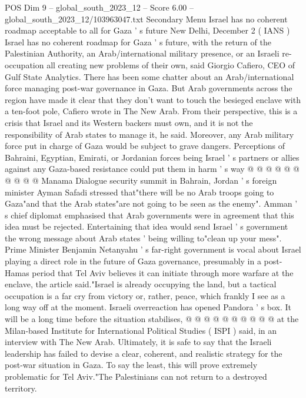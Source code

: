 \begin{textsample}{POS Dim 9 – global\_south\_2023\_12 – Score 6.00 – global\_south\_2023\_12/103963047.txt}  \label{ex:f9_pos_010}
Secondary Menu Israel has no coherent roadmap acceptable to all for Gaza ' s future New Delhi, December 2 ( IANS ) Israel has no coherent roadmap for Gaza ' s future, with the return of the Palestinian Authority, an Arab/international military presence, or an Israeli re-occupation all creating new problems of their own, said Giorgio Cafiero, CEO of Gulf State Analytics.
There has been some chatter about an Arab/international force managing post-war governance in Gaza.
But Arab governments across the region have made it clear that they don't want to touch the besieged enclave with a ten-foot pole, Cafiero wrote in The New Arab.
From their perspective, this is a crisis that Israel and its Western backers must own, and it is not the responsibility of Arab states to manage it, he said.
Moreover, any Arab military force put in charge of Gaza would be subject to grave dangers.
Perceptions of Bahraini, Egyptian, Emirati, or Jordanian forces being Israel ' s partners or allies against any Gaza-based resistance could put them in harm ' s way @ @ @ @ @ @ @ @ @ @ Manama Dialogue security summit in Bahrain, Jordan ' s foreign minister Ayman Safadi stressed that"there will be no Arab troops going to Gaza"and that the Arab states"are not going to be seen as the enemy".
Amman ' s chief diplomat emphasised that Arab governments were in agreement that this idea must be rejected.
Entertaining that idea would send Israel ' s government the wrong message about Arab states ' being willing to"clean up your mess".
Prime Minister Benjamin Netanyahu ' s far-right government is vocal about Israel playing a direct role in the future of Gaza governance, presumably in a post-Hamas period that Tel Aviv believes it can initiate through more warfare at the enclave, the article said."Israel is already occupying the land, but a tactical occupation is a far cry from victory or, rather, peace, which frankly I see as a long way off at the moment.
Israeli overreaction has opened Pandora ' s box.
It will be a long time before the situation stabilises, @ @ @ @ @ @ @ @ @ @ at the Milan-based Institute for International Political Studies ( ISPI ) said, in an interview with The New Arab.
Ultimately, it is safe to say that the Israeli leadership has failed to devise a clear, coherent, and realistic strategy for the post-war situation in Gaza.
To say the least, this will prove extremely problematic for Tel Aviv."The Palestinians can not return to a destroyed territory.

\end{textsample}
